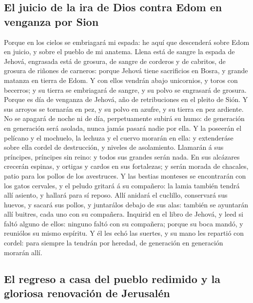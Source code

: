 \hypertarget{el-juicio-de-la-ira-de-dios-contra-edom-en-venganza-por-sion}{%
\subsection{El juicio de la ira de Dios contra Edom en venganza por
Sion}\label{el-juicio-de-la-ira-de-dios-contra-edom-en-venganza-por-sion}}

 Porque en los cielos se embriagará mi espada: he aquí que
descenderá sobre Edom en juicio, y sobre el pueblo de mi anatema.
 Llena está de sangre la espada de Jehová, engrasada está de
grosura, de sangre de corderos y de cabritos, de grosura de riñones de
carneros: porque Jehová tiene sacrificios en Bosra, y grande matanza en
tierra de Edom.  Y con ellos vendrán abajo unicornios, y
toros con becerros; y su tierra se embriagará de sangre, y su polvo se
engrasará de grosura.  Porque es día de venganza de Jehová,
año de retribuciones en el pleito de Sión.  Y sus arroyos se
tornarán en pez, y su polvo en azufre, y su tierra en pez ardiente.
 No se apagará de noche ni de día, perpetuamente subirá su
humo: de generación en generación será asolada, nunca jamás pasará nadie
por ella.  Y la poseerán el pelícano y el mochuelo, la
lechuza y el cuervo morarán en ella: y extenderáse sobre ella cordel de
destrucción, y niveles de asolamiento.  Llamarán á sus
príncipes, príncipes sin reino: y todos sus grandes serán nada.
 En sus alcázares crecerán espinas, y ortigas y cardos en
sus fortalezas; y serán morada de chacales, patio para los pollos de los
avestruces.  Y las bestias monteses se encontrarán con los
gatos cervales, y el peludo gritará á su compañero: la lamia también
tendrá allí asiento, y hallará para sí reposo.  Allí
anidará el cuclillo, conservará sus huevos, y sacará sus pollos, y
juntarálos debajo de sus alas: también se ayuntarán allí buitres, cada
uno con su compañera.  Inquirid en el libro de Jehová, y
leed si faltó alguno de ellos: ninguno faltó con su compañera; porque su
boca mandó, y reuniólos su mismo espíritu.  Y él les echó
las suertes, y su mano les repartió con cordel: para siempre la tendrán
por heredad, de generación en generación morarán allí.

\hypertarget{el-regreso-a-casa-del-pueblo-redimido-y-la-gloriosa-renovaciuxf3n-de-jerusaluxe9n}{%
\subsection{El regreso a casa del pueblo redimido y la gloriosa
renovación de
Jerusalén}\label{el-regreso-a-casa-del-pueblo-redimido-y-la-gloriosa-renovaciuxf3n-de-jerusaluxe9n}}

